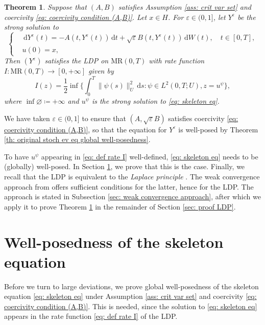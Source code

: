 \documentclass{amsart}
\newcommand{\dd}{\,\mathrm{d}}
\renewcommand{\MR}{\mathrm{MR}}
\newcommand{\<}{\langle}
\newcommand{\?}{\rangle}
\theoremstyle{plain}
\newtheorem{theorem}{Theorem}[section]
\theoremstyle{remark}
\theoremstyle{plain}
\numberwithin{equation}{section}
\newcommand{\eps}{\varepsilon}
\begin{document}
\begin{theorem}\label{th: main LDP theorem}
  Suppose that $(A,B)$ satisfies Assumption \ref{ass: crit var set} and coercivity \eqref{eq: coercivity condition (A,B)}. Let $x\in H$. For $\eps\in(0,1]$, let $Y^\eps$ be the strong solution to
  \begin{equation*}
  \begin{cases}
  &\dd Y^\eps(t)=-A(t,Y^\eps(t))\dd t
  +\sqrt{\eps}B(t,Y^\eps(t))\dd W(t), \quad t\in[0,T], \\
  &u(0)=x,
\end{cases}
\end{equation*}
Then $(Y^\eps)$ satisfies the LDP on $\MR(0,T)$ with rate function $I\colon \MR(0,T)\to [0,+\infty]$ given by
\begin{equation}\label{eq: def rate I}
I(z)=\frac{1}{2}\inf\Big\{\int_0^T\|\psi(s)\|_U^2\dd s : \psi\in L^2(0,T;U), z=u^{\psi}\Big\},
\end{equation}
where $\inf\varnothing\coloneqq +\infty$ and $u^\psi$ is the strong solution to \eqref{eq: skeleton eq}.
\end{theorem}

We have taken $\eps\in (0,1]$ to ensure that $(A,\sqrt{\eps}B)$ satisfies coercivity \eqref{eq: coercivity condition (A,B)}, so that the equation for $Y^\eps$ is well-posed by Theorem \ref{th: original stoch ev eq global well-posedness}.

To have $u^\psi$ appearing in \eqref{eq: def rate I} well-defined, \eqref{eq: skeleton eq} needs to be (globally) well-posed. In Section \ref{sec: skeleton}, we prove that this is the case.
Finally, we recall that the LDP is equivalent to the \emph{Laplace principle} \cite[Def. 1.2.2, Th. 1.2.1, Th. 1.2.3]{dupuis97}. The weak convergence approach from \cite{budhidupuis01}  offers sufficient conditions for the latter, hence for the LDP. The approach is stated in Subsection \ref{sec: weak convergence approach}, after which we apply it to prove Theorem \ref{th: main LDP theorem} in the remainder of Section \ref{sec: proof LDP}.




\section{Well-posedness of the skeleton equation}\label{sec: skeleton}

Before we turn to large deviations, we prove global well-posedness of the skeleton equation \eqref{eq: skeleton eq} under Assumption \ref{ass: crit var set} and coercivity \eqref{eq: coercivity condition (A,B)}. This is needed, since the solution to \eqref{eq: skeleton eq} appears in the rate function \eqref{eq: def rate I} of the LDP.
\end{document}
